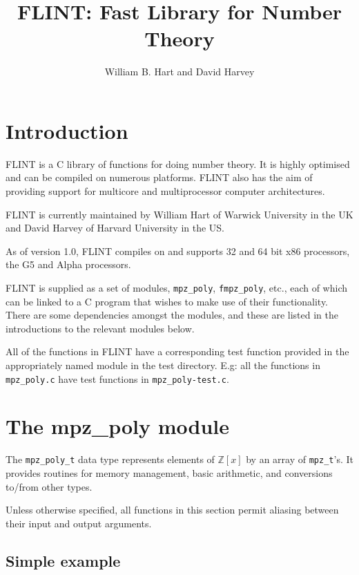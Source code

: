 \documentclass[a4paper,10pt]{article}
\title{FLINT: Fast Library for Number Theory}
\author{William B. Hart and David Harvey}
\newcommand{\Z}{\mathbb{Z}}
\newcommand{\code}{\lstinline}
\begin{document}
\maketitle
\lstset{language=c}
\lstset{basicstyle=\ttfamily}
\lstset{keywordstyle=}
\lstset{escapeinside=\%\%}

\section{Introduction}

FLINT is a C library of functions for doing number theory. It is highly optimised and can be compiled on numerous platforms. FLINT also has the aim of providing support for multicore and multiprocessor computer architectures.

FLINT is currently maintained by William Hart of Warwick University in the UK and David Harvey of Harvard University in the US.

As of version 1.0, FLINT compiles on and supports 32 and 64 bit x86 processors, the G5 and Alpha processors.

FLINT is supplied as a set of modules, \code{mpz_poly}, \code{fmpz_poly}, etc., each of which can be linked to a C program that wishes to make use of their functionality. There are some dependencies amongst the modules, and these are listed in the introductions to the relevant modules below.

All of the functions in FLINT have a corresponding test function provided in the appropriately named module in the test directory. E.g: all the functions in \code{mpz_poly.c} have test functions in \code{mpz_poly-test.c}.


\section{The mpz\_poly module}

The \code{mpz_poly_t} data type represents elements of $\Z[x]$ by an array of \code{mpz_t}'s. It provides routines for memory management, basic arithmetic, and conversions to/from other types.

Unless otherwise specified, all functions in this section permit aliasing between their input and output arguments.


\subsection{Simple example}
\end{document}
